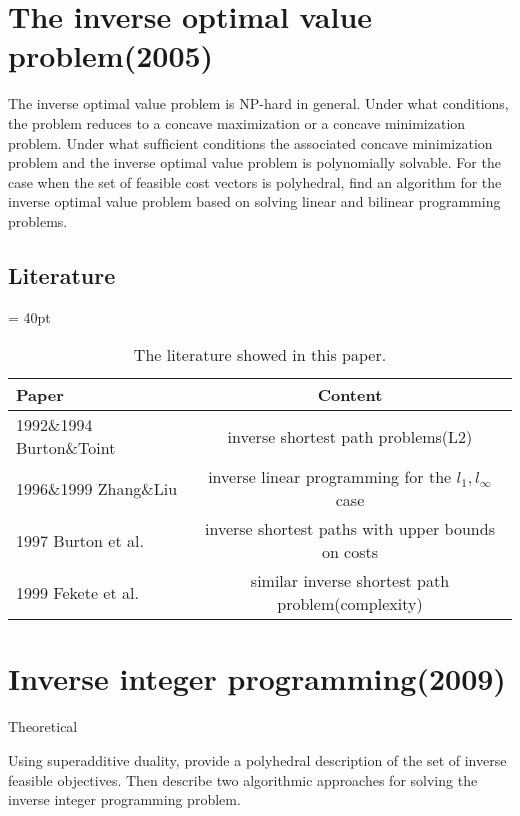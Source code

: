 \documentclass[UTF8]{article}
\begin{document}
\section{The inverse optimal value problem(2005)}

The inverse optimal value problem is NP-hard in general. Under what conditions, the problem reduces to a concave maximization or a concave minimization problem. Under what sufﬁcient conditions the associated concave minimization problem and the inverse optimal value problem is polynomially solvable. For the case when the set of feasible cost vectors is polyhedral, find an algorithm for the inverse optimal value problem based on solving linear and bilinear programming problems.


\subsection{Literature}

\begin{table}[ht]

\tabcolsep = 40pt

\small\renewcommand{}

\caption{The literature showed in this paper.\label{tab:6}}

{\begin{tabular}{lc}
\hline
Paper & Content \\
\hline
1992\&1994 Burton\&Toint & inverse shortest path problems(L2) \\
\hline
1996\&1999 Zhang\&Liu & inverse linear programming for the  $l_1, l_\infty$ case  \\
\hline
1997 Burton et al. & inverse shortest paths with upper bounds on costs \\
\hline
1999 Fekete et al. & similar inverse shortest path problem(complexity) \\
\hline
\end{tabular}}
{}
\end{table}



\section{Inverse integer programming(2009)}

Theoretical

Using superadditive duality, provide a polyhedral description of the set of inverse feasible objectives. Then describe two algorithmic approaches for solving the inverse integer programming problem.
\end{document}
